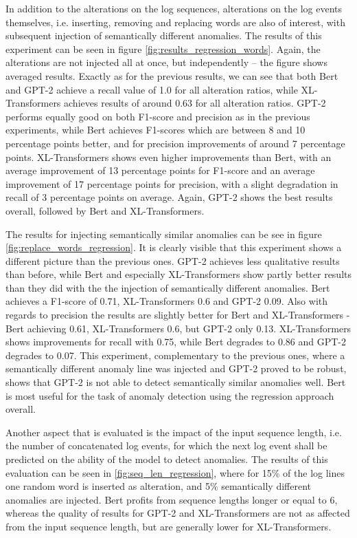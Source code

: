 In addition to the alterations on the log sequences, alterations on the log events themselves, i.e. inserting, removing and replacing words are also of interest, with subsequent injection of semantically different anomalies. The results of this experiment can be seen in figure \ref{fig:results_regression_words}. Again, the alterations are not injected all at once, but independently -- the figure shows averaged results. Exactly as for the previous results, we can see that both Bert and GPT-2 achieve a recall value of 1.0 for all alteration ratios, while XL-Transformers achieves results of around 0.63 for all alteration ratios. GPT-2 performs equally good on both F1-score and precision as in the previous experiments, while Bert achieves F1-scores which are between 8 and 10 percentage points better, and for precision improvements of around 7 percentage points. XL-Transformers shows even higher improvements than Bert, with an average improvement of 13 percentage points for F1-score and an average improvement of 17 percentage points for precision, with a slight degradation in recall of 3 percentage points on average. Again, GPT-2 shows the best results overall, followed by Bert and XL-Transformers.

The results for injecting semantically similar anomalies can be see in figure \ref{fig:replace_words_regression}. It is clearly visible that this experiment shows a different picture than the previous ones. GPT-2 achieves less qualitative results than before, while Bert and especially XL-Transformers show partly better results than they did with the the injection of semantically different anomalies. Bert achieves a F1-score of 0.71, XL-Transformers 0.6 and GPT-2 0.09. Also with regards to precision the results are slightly better for Bert and XL-Transformers - Bert achieving 0.61, XL-Transformers 0.6, but GPT-2 only 0.13. XL-Transformers shows improvements for recall with 0.75, while Bert degrades to 0.86 and GPT-2 degrades to 0.07. This experiment, complementary to the previous ones, where a semantically different anomaly line was injected and GPT-2 proved to be robust, shows that GPT-2 is not able to detect semantically similar anomalies well. Bert is most useful for the task of anomaly detection using the regression approach overall.

Another aspect that is evaluated is the impact of the input sequence length, i.e. the number of concatenated log events, for which the next log event shall be predicted on the ability of the model to detect anomalies. The results of this evaluation can be seen in \ref{fig:seq_len_regression}, where for 15\% of the log lines one random word is inserted as alteration, and 5\% semantically different anomalies are injected. Bert profits from sequence lengths longer or equal to 6, whereas the quality of results for GPT-2 and XL-Transformers are not as affected from the input sequence length, but are generally lower for XL-Transformers.

